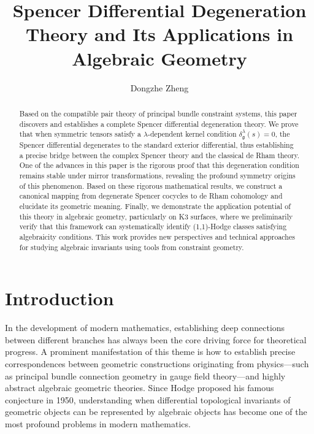 \documentclass[a4paper,12pt]{extarticle}
\theoremstyle{plain}
\theoremstyle{definition}
\begin{document}
\pagestyle{plain}

\title{Spencer Differential Degeneration Theory and Its Applications in Algebraic Geometry}
\author{Dongzhe Zheng}
\date{}
\maketitle

\begin{abstract}
Based on the compatible pair theory of principal bundle constraint systems, this paper discovers and establishes a complete Spencer differential degeneration theory. We prove that when symmetric tensors satisfy a $\lambda$-dependent kernel condition $\delta_{\mathfrak{g}}^{\lambda}(s)=0$, the Spencer differential degenerates to the standard exterior differential, thus establishing a precise bridge between the complex Spencer theory and the classical de Rham theory. One of the advances in this paper is the rigorous proof that this degeneration condition remains stable under mirror transformations, revealing the profound symmetry origins of this phenomenon. Based on these rigorous mathematical results, we construct a canonical mapping from degenerate Spencer cocycles to de Rham cohomology and elucidate its geometric meaning. Finally, we demonstrate the application potential of this theory in algebraic geometry, particularly on K3 surfaces, where we preliminarily verify that this framework can systematically identify (1,1)-Hodge classes satisfying algebraicity conditions. This work provides new perspectives and technical approaches for studying algebraic invariants using tools from constraint geometry.
\end{abstract}

\section{Introduction}
\label{sec:introduction}

In the development of modern mathematics, establishing deep connections between different branches has always been the core driving force for theoretical progress. A prominent manifestation of this theme is how to establish precise correspondences between geometric constructions originating from physics—such as principal bundle connection geometry in gauge field theory\cite{KobayashiNomizu1963, Atiyah1957, ChernWeil1944}—and highly abstract algebraic geometric theories. Since Hodge proposed his famous conjecture in 1950\cite{Hodge1950}, understanding when differential topological invariants of geometric objects can be represented by algebraic objects has become one of the most profound problems in modern mathematics.
\end{document}

